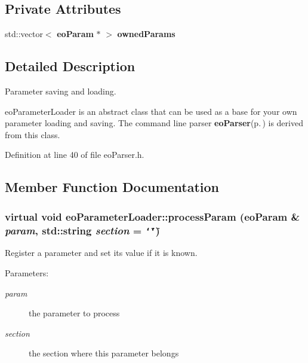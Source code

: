 \subsection*{Private Attributes}
\begin{CompactItemize}
\item 
std::vector$<$ {\bf eo\-Param} $\ast$ $>$ {\bf owned\-Params}\label{classeo_parameter_loader_r0}

\end{CompactItemize}


\subsection{Detailed Description}
Parameter saving and loading. 

eo\-Parameter\-Loader is an abstract class that can be used as a base for your own parameter loading and saving. The command line parser {\bf eo\-Parser}{\rm (p.\,\pageref{classeo_parser})} is derived from this class. 



Definition at line 40 of file eo\-Parser.h.

\subsection{Member Function Documentation}
\subsubsection{\setlength{\rightskip}{0pt plus 5cm}virtual void eo\-Parameter\-Loader::process\-Param ({\bf eo\-Param} \& {\em param}, std::string {\em section} = {\tt \char`\"{}\char`\"{}})\hspace{0.3cm}{\tt  [pure virtual]}}\label{classeo_parameter_loader_a1}


Register a parameter and set its value if it is known. 

\begin{Desc}
\item[Parameters:]
\begin{description}
\item[{\em param}]the parameter to process \item[{\em section}]the section where this parameter belongs \end{description}
\end{Desc}



